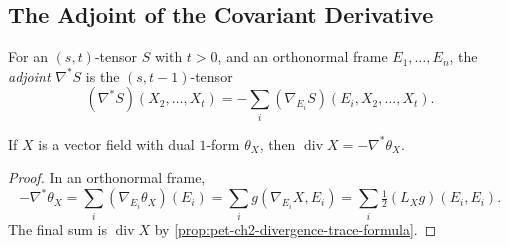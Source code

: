 \subsection{The Adjoint of the Covariant Derivative}

\begin{definition}
  \label{def:pet-ch2-covariant-derivative-adjoint}


  For an $(s,t)$-tensor $S$ with $t>0$, and an orthonormal frame
  $E_1,\dots,E_n$, the \emph{adjoint} $\nabla^*S$ is the $(s,t-1)$-tensor
  \[
    (\nabla^*S)(X_2,\dots,X_t)=-\sum_i(\nabla_{E_i}S)(E_i,X_2,\dots,X_t).
  \]
\end{definition}

\begin{proposition}
  \label{prop:pet-ch2-divergence-adjoint-formula}


  If $X$ is a vector field with dual $1$-form $\theta_X$, then
  $\operatorname{div}X=-\nabla^*\theta_X$.
\end{proposition}
\begin{proof}

  \sketch
  In an orthonormal frame,
  \[
    -\nabla^*\theta_X
      =\sum_i(\nabla_{E_i}\theta_X)(E_i)
      =\sum_i g(\nabla_{E_i}X,E_i)
      =\sum_i\tfrac12(L_Xg)(E_i,E_i).
  \]
  The final sum is $\operatorname{div}X$ by
  \cref{prop:pet-ch2-divergence-trace-formula}.
\end{proof}

